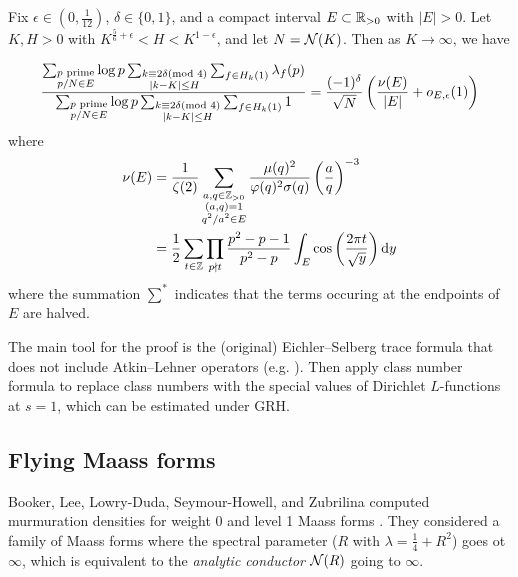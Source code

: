 \begin{theorem}
    Fix $\epsilon \in (0, \frac{1}{12})$, $\delta \in \{0, 1\}$, and a compact interval $E \subset \mathbb{R}_{> 0}$ with $|E| > 0$.
    Let $K, H > 0$ with $K^{\frac{5}{6} + \epsilon} < H < K^{1 - \epsilon}$, and let $N = \mathcal{N}(K)$.
    Then as $K \to \infty$, we have

    \begin{equation}
        \frac{
            \sum_{\substack{p \text{ prime} \\ p / N \in E}}
            \log p
            \sum_{\substack{k \equiv 2 \delta (\text{mod }4) \\ |k - K| \le H}}
            \sum_{f \in H_k(1)} \lambda_f(p)
        }
        {
            \sum_{\substack{p \text{ prime} \\ p / N \in E}} 
            \log p 
            \sum_{\substack{k \equiv 2 \delta (\text{mod }4) \\ |k - K| \le H}} 
            \sum_{f \in H_k(1)} 1
        } = \frac{(-1)^\delta}{\sqrt{N}} \left(\frac{\nu(E)}{|E|} + o_{E, \epsilon}(1)\right)
    \end{equation}
    where
    \begin{align}
        \nu(E) &= \frac{1}{\zeta(2)} \sum_{\substack{a, q \in \mathbb{Z}_{>0} \\ (a, q) = 1 \\ q^2 / a^2 \in E}} \frac{\mu(q)^2}{\varphi(q)^2 \sigma(q)} \left(\frac{a}{q}\right)^{-3} \\
        &= \frac{1}{2} \sum_{t \in \mathbb{Z}} \prod_{p \nmid t} \frac{p^2 - p - 1}{p^2 - p} \int_E \cos\left(\frac{2 \pi t}{\sqrt{y}}\right) \mathrm{d} y
    \end{align}
    where the summation $\sum^{*}$ indicates that the terms occuring at the endpoints of $E$ are halved. 
\end{theorem}

The main tool for the proof is the (original) Eichler--Selberg trace formula that does not include Atkin--Lehner operators (e.g. \cite[Theorem 2.1]{child2022twist}).
Then apply class number formula to replace class numbers with the special values of Dirichlet $L$-functions at $s = 1$, which can be estimated under GRH.

\subsection{Flying Maass forms}

Booker, Lee, Lowry-Duda, Seymour-Howell, and Zubrilina computed murmuration densities for weight 0 and level 1 Maass forms \cite{booker2024murmurations}.
They considered a family of Maass forms where the spectral parameter ($R$ with $\lambda = \frac{1}{4} + R^2$) goes ot $\infty$, which is equivalent to the \emph{analytic conductor} $\mathcal{N}(R)$ going to $\infty$.

